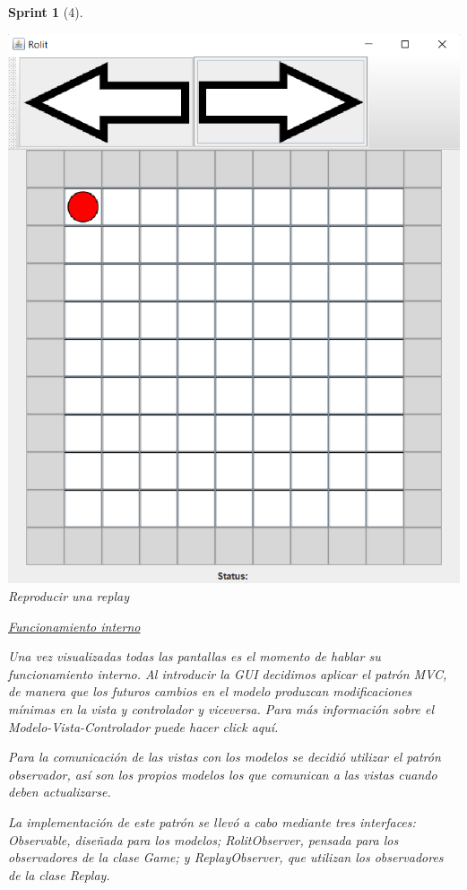 \documentclass[12pt,a4paper,openright]{book}
\theoremstyle{break}
\newtheorem*{sprint}{Sprint}
\begin{document}
\begin{sprint}[4]
\begin{center}
\includegraphics[scale=0.9]{replay-sprint3.png}
Reproducir una \textit{replay}
\end{center}

\underline{Funcionamiento interno}

Una vez visualizadas todas las pantallas es el momento de hablar su funcionamiento interno. Al introducir la GUI decidimos aplicar el patrón MVC, de manera que los futuros cambios en el modelo produzcan modificaciones mínimas en la vista y controlador y viceversa. Para más información sobre el Modelo-Vista-Controlador puede hacer click aquí. %

Para la comunicación de las vistas con los modelos se decidió utilizar el patrón observador, así son los propios modelos los que comunican a las vistas cuando deben actualizarse.

La implementación de este patrón se llevó a cabo mediante tres interfaces: Observable, diseñada para los modelos; RolitObserver, pensada para los observadores de la clase \textit{Game}; y ReplayObserver, que utilizan los observadores de la clase \textit{Replay}.


\end{sprint}
\end{document}
